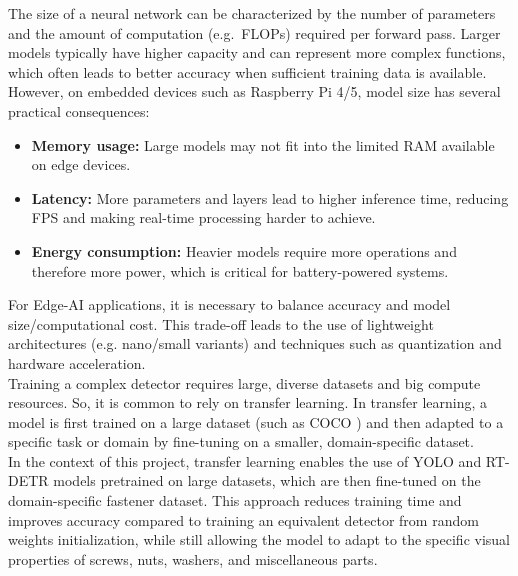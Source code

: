\documentclass[12pt,a4paper]{report}
\begin{document}
The size of a neural network can be characterized by the number of parameters
and the amount of computation (e.g.\ FLOPs) required per forward pass.
Larger models typically have higher capacity and can represent more complex functions,
which often leads to better accuracy when sufficient training data is available. \\

However, on embedded devices such as Raspberry Pi 4/5, model size has
several practical consequences:

\begin{itemize}[leftmargin=1.5em]
    \item \textbf{Memory usage:} Large models may not fit into the limited RAM available on edge devices.
    \item \textbf{Latency:} More parameters and layers lead to higher inference time, reducing FPS and making
          real-time processing harder to achieve.
    \item \textbf{Energy consumption:} Heavier models require more operations and therefore more power,
          which is critical for battery-powered systems.
\end{itemize}

For Edge-AI applications, it is necessary to balance accuracy and model size/computational
cost. This trade-off leads to the use of lightweight architectures
(e.g. nano/small variants) and
techniques such as quantization and hardware acceleration. \\

Training a complex detector requires large, diverse datasets and big compute
resources. So, it is common to rely on transfer learning. In transfer learning, a model
is first trained on a large dataset (such as COCO \cite{Lin2014COCO}) and then adapted to a specific task
or domain  by fine-tuning on a smaller, domain-specific dataset. \\

In the context of this project, transfer learning enables the use of YOLO and RT-DETR models
pretrained on large datasets, which are then fine-tuned on the domain-specific fastener dataset.
This approach reduces training time and improves accuracy compared to training
an equivalent detector from random weights initialization, while still allowing the model to adapt
to the specific visual properties of screws, nuts, washers, and miscellaneous parts.
\end{document}
